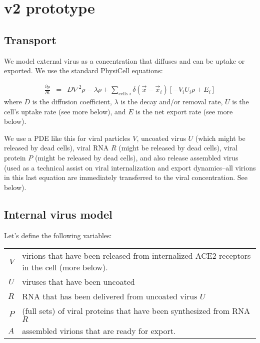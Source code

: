 \documentclass[12point]{article}
\begin{document}
\section{v2 prototype}

\subsection{Transport}
We model external virus as a concentration that diffuses and can be uptake or exported. We use the standard PhysiCell equations: 

\begin{eqnarray}
\frac{\partial \rho }{\partial t} & = & 
D \nabla^2 \rho - \lambda \rho + 
\sum_{\textrm{cells }i} 
\delta( \vec{x} - \vec{x}_i ) \left[ 
-V_i U_i \rho + E_i 
\right]
\end{eqnarray}
where $D$ is the diffusion coefficient, $\lambda$ is the decay and/or removal rate, 
$U$ is the cell's uptake rate (see more below), and $E$ is the net export rate (see more below). 

We use a PDE like this for viral particles $V$, uncoated virus $U$ (which might be released by dead cells), viral RNA $R$ (might be released by dead cells), viral protein $P$ (might be released by dead cells), and also 
release assembled virus (used as a technical assist on viral internalization and export dynamics--all virions in this last equation are immediately transferred to the viral concentration. See below). 

\subsection{Internal virus model}
Let's define the following variables: \\

\begin{centering}
\begin{tabular}{rl} 
$V$ & virions that have been released from internalized ACE2 receptors in the cell (more below). \\
$U$ & viruses that have been uncoated \\
$R$ & RNA that has been delivered from uncoated virus $U$ \\
$P$ & (full sets) of viral proteins that have been synthesized from RNA $R$ \\
$A$ & assembled virions that are ready for export. 
\end{tabular}
\end{centering}
\end{document}
